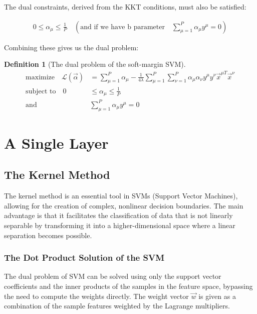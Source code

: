 \documentclass[11pt]{book} %
\newtheorem{definition}{Definition}[section]
\begin{document}
The dual constraints, derived from the KKT conditions, must also be satisfied:

\begin{align*}
    0 \leq \alpha_{\mu} \leq \frac{1}{P} \quad \left( \text{and if we have b parameter} \quad \sum_{\mu=1}^P \alpha_{\mu} y^{\mu} = 0 \right)
\end{align*}

Combining these gives us the dual problem:

\begin{definition}[The dual problem of the soft-margin SVM]
    \begin{align*}
        \text{maximize} \quad \mathcal{L}(\vec{\alpha}) &= \sum_{\mu=1}^P \alpha_{\mu} - \frac{1}{4\lambda} \sum_{\mu=1}^P \sum_{\nu=1}^P \alpha_{\mu} \alpha_{\nu} y^{\mu} y^{\nu} \vec{x}^{\mu T} \vec{x}^{\nu} \\
        \text{subject to} \quad 0 &\leq \alpha_{\mu} \leq \frac{1}{P} \\
        \text{and} \quad &\sum_{\mu=1}^P \alpha_{\mu} y^{\mu} = 0
    \end{align*}
\end{definition}







%
%
%
%
%
%
%
%
%
%
%
%
%
%
%
%


\chapter{A Single Layer}

\section{The Kernel Method}

The kernel method is an essential tool in SVMs (Support Vector Machines), allowing for the creation of complex, nonlinear decision boundaries. The main advantage is that it facilitates the classification of data that is not linearly separable by transforming it into a higher-dimensional space where a linear separation becomes possible.

\subsection{The Dot Product Solution of the SVM}
The dual problem of SVM can be solved using only the support vector coefficients and the inner products of the samples in the feature space, bypassing the need to compute the weights directly. The weight vector $\vec{w}$ is given as a combination of the sample features weighted by the Lagrange multipliers.
\end{document}
